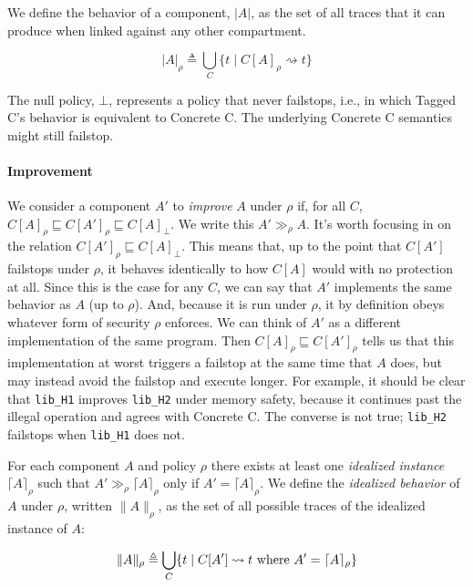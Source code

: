 \documentclass{article}
\begin{document}
We define the behavior of a component, \(|A|\), as the set of all traces
that it can produce when linked against any other compartment.

\[|A|_{\rho} \triangleq \bigcup_{C} \{ t \mid C[A]_{\rho} \rightsquigarrow t \}\]

The null policy, \(\bot\), represents a policy that never failstops,
i.e., in which Tagged C's behavior is equivalent to Concrete C.
The underlying Concrete C semantics might still failstop.

%

\paragraph{Improvement}

We consider a component \(A'\) to {\em improve} \(A\) under \(\rho\) if, for all \(C\),
\(C[A]_\rho \sqsubseteq C[A']_\rho \sqsubseteq C[A]_\bot\).
We write this \(A' \gg_\rho A\).
It's worth focusing in on the relation \(C[A']_\rho \sqsubseteq C[A]_\bot\). This means that,
up to the point that \(C[A']\) failstops under \(\rho\), it behaves identically to
how \(C[A]\) would with no protection at all. Since this is the case for any \(C\), we can say
that \(A'\) implements the same behavior as \(A\) (up to \(\rho\)). And, because it is run
under \(\rho\), it by definition obeys whatever form of security \(\rho\) enforces.
We can think of \(A'\) as a different implementation of the same program.
Then \(C[A]_\rho \sqsubseteq C[A']_\rho\) tells us that this implementation at worst
triggers a failstop at the same time that \(A\) does, but may instead avoid the failstop
and execute longer. For example, it should be clear that {\tt lib\_H1} improves
{\tt lib\_H2} under memory safety, because it continues past the illegal operation and
agrees with Concrete C. The converse is not true; {\tt lib\_H2} failstops when {\tt lib\_H1}
does not.

For each component \(A\) and policy \(\rho\) there exists at least one {\em idealized instance}
\(\lceil A \rceil_\rho\) such that \(A' \gg_\rho \lceil A \rceil_\rho\) only if
\(A' = \lceil A \rceil_\rho\). We define the {\em idealized behavior} of \(A\) under
\(\rho\), written \(\| A \|_\rho\), as the set of all possible traces of the idealized
instance of \(A\):

\[\| A \|_\rho \triangleq \bigcup_{C} \{ t \mid C[A'] \rightsquigarrow t \textnormal{ where }
A' = \lceil A \rceil_\rho\} \]
\end{document}
